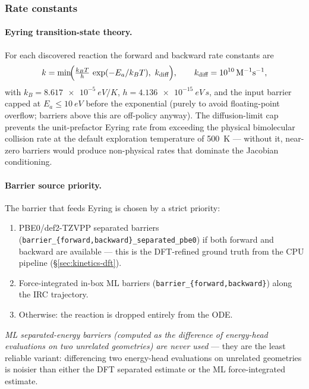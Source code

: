 \subsubsection{Rate constants}
\label{sec:kinetics-rates}

\paragraph{Eyring transition-state theory.}
For each discovered reaction the forward and backward rate constants are
\begin{equation}
    k = \min\!\Bigl(\tfrac{k_B T}{h}\,\exp(-E_a / k_B T),\ k_\text{diff}\Bigr), \qquad k_\text{diff} = \SI{e10}{M^{-1}s^{-1}},
\end{equation}
with $k_B = \SI{8.617e-5}{eV/K}$, $h = \SI{4.136e-15}{eV\,s}$, and the input barrier capped at $E_a \leq \SI{10}{eV}$ before the exponential (purely to avoid floating-point overflow; barriers above this are off-policy anyway). The diffusion-limit cap prevents the unit-prefactor Eyring rate from exceeding the physical bimolecular collision rate at the default exploration temperature of \SI{500}{K} --- without it, near-zero barriers would produce non-physical rates that dominate the Jacobian conditioning.

\paragraph{Barrier source priority.}
The barrier that feeds Eyring is chosen by a strict priority:
\begin{enumerate}
    \item PBE0/def2-TZVPP separated barriers (\texttt{barrier\_\{forward,backward\}\_separated\_pbe0}) if both forward and backward are available --- this is the DFT-refined ground truth from the CPU pipeline (\S\ref{sec:kinetics-dft}).
    \item Force-integrated in-box ML barriers (\texttt{barrier\_\{forward,backward\}}) along the IRC trajectory.
    \item Otherwise: the reaction is dropped entirely from the ODE.
\end{enumerate}
\emph{ML separated-energy barriers (computed as the difference of energy-head evaluations on two unrelated geometries) are never used} --- they are the least reliable variant: differencing two energy-head evaluations on unrelated geometries is noisier than either the DFT separated estimate or the ML force-integrated estimate.

